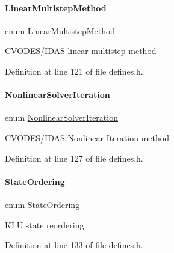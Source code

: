 \paragraph{\texorpdfstring{Linear\+Multistep\+Method}{LinearMultistepMethod}}
{\footnotesize\ttfamily enum \mbox{\hyperlink{namespaceamici_a9ebe272482a8e073efe7078b7e96e8bc}{Linear\+Multistep\+Method}}\hspace{0.3cm}{\ttfamily [strong]}}

C\+V\+O\+D\+E\+S/\+I\+D\+AS linear multistep method 

Definition at line 121 of file defines.\+h.

\mbox{\label{namespaceamici_a13388d34e4c35bb592c3e821c35cc923}} 
\paragraph{\texorpdfstring{Nonlinear\+Solver\+Iteration}{NonlinearSolverIteration}}
{\footnotesize\ttfamily enum \mbox{\hyperlink{namespaceamici_a13388d34e4c35bb592c3e821c35cc923}{Nonlinear\+Solver\+Iteration}}\hspace{0.3cm}{\ttfamily [strong]}}

C\+V\+O\+D\+E\+S/\+I\+D\+AS Nonlinear Iteration method 

Definition at line 127 of file defines.\+h.

\mbox{\label{namespaceamici_a890d968060d6d830aeed98dbeb04447f}} 
\paragraph{\texorpdfstring{State\+Ordering}{StateOrdering}}
{\footnotesize\ttfamily enum \mbox{\hyperlink{namespaceamici_a890d968060d6d830aeed98dbeb04447f}{State\+Ordering}}\hspace{0.3cm}{\ttfamily [strong]}}

K\+LU state reordering 

Definition at line 133 of file defines.\+h.

\mbox{\label{namespaceamici_a1f7d44f04185d57423d01d47d13470a6}} 
